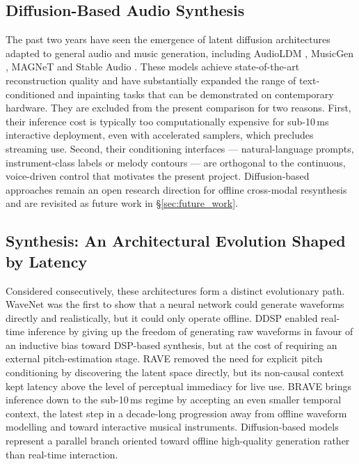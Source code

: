 \documentclass[a4paper,11pt,oneside,openany]{book}
\begin{document}
\subsection*{Diffusion-Based Audio Synthesis}\label{subsec:diffusion}

The past two years have seen the emergence of latent diffusion architectures adapted to general audio and music generation, including AudioLDM \parencite{liu2023audioldm}, MusicGen \parencite{copet2023musicgen}, MAGNeT \parencite{ziv2024magnet} and Stable Audio \parencite{evans2024stableaudio}. These models achieve state-of-the-art reconstruction quality and have substantially expanded the range of text-conditioned and inpainting tasks that can be demonstrated on contemporary hardware. They are excluded from the present comparison for two reasons. First, their inference cost is typically too computationally expensive for sub-10\,ms interactive deployment, even with accelerated samplers, which precludes streaming use. Second, their conditioning interfaces --- natural-language prompts, instrument-class labels or melody contours --- are orthogonal to the continuous, voice-driven control that motivates the present project. Diffusion-based approaches remain an open research direction for offline cross-modal resynthesis and are revisited as future work in \S\ref{sec:future_work}.

\subsection*{Synthesis: An Architectural Evolution Shaped by Latency}\label{subsec:arch_synthesis}

Considered consecutively, these architectures form a distinct evolutionary path. WaveNet was the first to show that a neural network could generate waveforms directly and realistically, but it could only operate offline. DDSP enabled real-time inference by giving up the freedom of generating raw waveforms in favour of an inductive bias toward DSP-based synthesis, but at the cost of requiring an external pitch-estimation stage. RAVE removed the need for explicit pitch conditioning by discovering the latent space directly, but its non-causal context kept latency above the level of perceptual immediacy for live use. BRAVE brings inference down to the sub-10\,ms regime by accepting an even smaller temporal context, the latest step in a decade-long progression away from offline waveform modelling and toward interactive musical instruments. Diffusion-based models represent a parallel branch oriented toward offline high-quality generation rather than real-time interaction.
\end{document}
